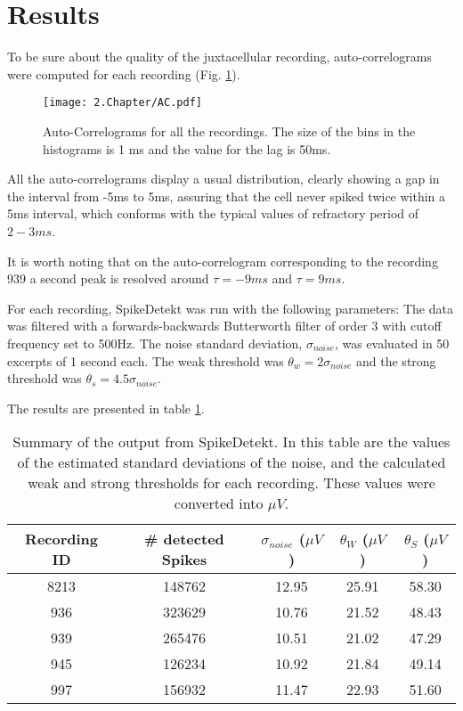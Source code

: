 
\section{Results}
\label{sec:chap2-results}
To be sure about the quality of the juxtacellular recording, auto-correlograms were computed for each recording (Fig. \ref{fig:AC}).
\begin{figure}[!h]
	\centering
	\texttt{[image: 2.Chapter/AC.pdf]}
	\caption{Auto-Correlograms for all the recordings. The size of the bins in the histograms is 1 ms and the value for the lag is 50ms.
}
\label{fig:AC}
\end{figure}

All the auto-correlograms display a usual distribution, clearly showing a gap in the interval from -5ms to 5ms, assuring that the cell never spiked twice  within a 5ms interval, which conforms with the typical values of refractory period of $2-3ms$.

It is worth noting that on the auto-correlogram corresponding to the recording 939 a second peak is resolved around $\tau = -9 ms$ and $\tau = 9 ms$.

For each recording, SpikeDetekt was run with the following parameters:
The data was filtered with a forwards-backwards Butterworth filter of order 3 with cutoff frequency set to 500Hz. The noise standard deviation, $\sigma_{noise}$, was evaluated in 50 excerpts of 1 second each. The weak threshold was $\theta_w = 2 \sigma_{noise}$ and the strong threshold was $\theta_s = 4.5 \sigma_{noise}$.

The results are presented in table \ref{tab:results-from-phy}.

\begin{table}[!h]

\begin{center}
\begin{tabular}{ccccc}
Recording ID & \# detected Spikes & $\sigma_{noise}$ ($\mu V$) & $\theta_W$ ($\mu V$) & $\theta_S$ ($\mu V$) \\ \hline
8213 & 148762 &  12.95 & 25.91 & 58.30 \\ 
936 & 323629 & 10.76 & 21.52 & 48.43 \\ 
939 & 265476 & 10.51 & 21.02 & 47.29 \\ 
945 & 126234 & 10.92 & 21.84 & 49.14 \\ 
997 & 156932 & 11.47 & 22.93 & 51.60 \\ 
\end{tabular}
\end{center}
\caption{Summary of the output from SpikeDetekt. In this table are the values of the estimated standard deviations of the noise, and the calculated weak and strong thresholds for each recording. These values were converted into $\mu V$.}
\label{tab:results-from-phy}
\end{table}

